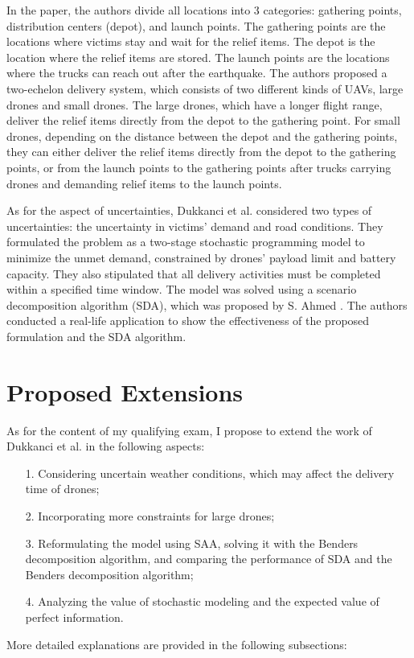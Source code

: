 \documentclass{lxaiproposal}
\begin{document}
In the paper, the authors divide all locations into 3 categories: gathering points, distribution centers (depot), and launch points. The gathering points are the locations where victims stay and wait for the relief items. The depot is the location where the relief items are stored. The launch points are the locations where the trucks can reach out after the earthquake. The authors proposed a two-echelon delivery system, which consists of two different kinds of UAVs, large drones and small drones. The large drones, which have a longer flight range, deliver the relief items directly from the depot to the gathering point. For small drones, depending on the distance between the depot and the gathering points, they can either deliver the relief items directly from the depot to the gathering points, or from the launch points to the gathering points after trucks carrying drones and demanding relief items to the launch points.

As for the aspect of uncertainties, Dukkanci et al. considered two types of uncertainties: the uncertainty in victims' demand and road conditions. They formulated the problem as a two-stage stochastic programming model to minimize the unmet demand, constrained by drones' payload limit and battery capacity. They also stipulated that all delivery activities must be completed within a specified time window. The model was solved using a scenario decomposition algorithm (SDA), which was proposed by S. Ahmed \cite{ahmed2013SDA}. The authors conducted a real-life application to show the effectiveness of the proposed formulation and the SDA algorithm.


\section{Proposed Extensions}
\vspace*{-3mm}


As for the content of my qualifying exam, I propose to extend the work of Dukkanci et al. in the following aspects:
\begin{enumerate}
    \item[1.] Considering uncertain weather conditions, which may affect the delivery time of drones;
    \item[2.] Incorporating more constraints for large drones;
    \item[3.] Reformulating the model using SAA, solving it with the Benders decomposition algorithm, and comparing the performance of SDA and the Benders decomposition algorithm;
    \item[4.] Analyzing the value of stochastic modeling and the expected value of perfect information.
\end{enumerate}
More detailed explanations are provided in the following subsections:
\end{document}
